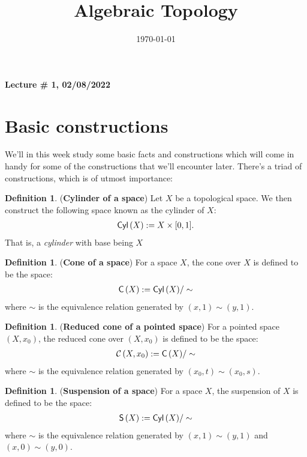 \documentclass[letterpaper,11pt,twoside]{article}
\title{\bfseries \Large{ Algebraic Topology}}
\date{\today}
\theoremstyle{definition}
\theoremstyle{definition}
\newtheorem{definition}[proposition]{Definition}
\theoremstyle{definition}
\theoremstyle{definition}
\theoremstyle{definition}
\theoremstyle{definition}
\theoremstyle{remark}
\theoremstyle{definition}
\newcommand{\newlecture}[2]{\begin{center}
    \textbf{Lecture \# #1, #2}
\end{center}}
\newcommand{\cyl}[1]{{\fontfamily{lmss}\selectfont 
		\text{Cyl}\left(#1\right)
}}
\newcommand{\cone}[1]{{\fontfamily{lmss}\selectfont 
		\text{C}\left(#1\right)
}}
\newcommand{\rcone}[1]{{\fontfamily{lmss}\selectfont 
		\mathcal{C}\left(#1\right)
}}
\newcommand{\susp}[1]{{\fontfamily{lmss}\selectfont 
		\text{S}\left(#1\right)
}}
\begin{document}
	
	\maketitle
	
	
	\tableofcontents
\newpage
\newlecture{1}{02/08/2022}
\section{Basic constructions}
We'll in this week study some basic facts and constructions which will come in handy for some of the constructions that we'll encounter later. There's a triad of constructions, which is of utmost importance:
\begin{definition}
(\textbf{Cylinder of a space}) Let $X$ be a topological space. We then construct the following space known as the cylinder of $X$:
\begin{align*}
    \cyl{X} := X\times[0,1].
\end{align*}
That is, a \textit{cylinder} with base being $X$
\end{definition}
\begin{definition}
(\textbf{Cone of a space}) For a space $X$, the cone over $X$ is defined to be the space:
\begin{align*}
    \cone{X} := \cyl{X}/\sim
\end{align*}
where $\sim$ is the equivalence relation generated by $(x,1) \sim (y,1)$.
\end{definition}
\begin{definition}
(\textbf{Reduced cone of a pointed space}) For a pointed space $(X,x_0)$, the reduced cone over $(X,x_0)$ is defined to be the space:
\begin{align*}
    \rcone{X,x_0} := \cone{X}/\sim
\end{align*}
where $\sim$ is the equivalence relation generated by $(x_0,t) \sim (x_0,s)$.
\end{definition}
\begin{definition}
    (\textbf{Suspension of a space}) For a space $X$, the suspension of $X$ is defined to be the space:
    \begin{align*}
        \susp{X} := \cyl{X}/\sim
    \end{align*}
    where $\sim$ is the equivalence relation generated by $(x,1)\sim (y,1)$ and $(x,0) \sim (y,0)$.
\end{definition}
\end{document}
